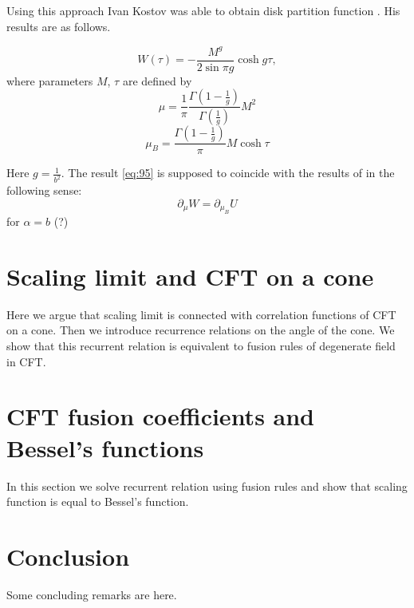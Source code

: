 \documentclass[12pt]{article}
\begin{document}
Using this approach Ivan Kostov was able to obtain disk partition function
\cite{kostov2004boundary,kostov2003boundary}. His results are as follows. 

\begin{equation}
  \label{eq:95}
  W(\tau) = -\frac{M^{g}}{2\sin \pi g} \cosh g\tau,
\end{equation}
where parameters $M$, $\tau$ are defined by
\begin{equation}
  \label{eq:96}
  \mu=\frac{1}{\pi} \frac{\Gamma\left(1-\frac{1}{g}\right)}{\Gamma\left(\frac{1}{g}\right)} M^{2}
\end{equation}
\begin{equation}
  \label{eq:97}
  \mu_{B}=\frac{\Gamma\left(1-\frac{1}{g}\right)}{\pi} M\cosh \tau
\end{equation}

Here $g=\frac{1}{b^{2}}$. The result \eqref{eq:95} is supposed to coincide with the results of
\cite{fateev2000boundary} in the following sense:
\begin{equation}
  \label{eq:98}
  \partial_{\mu} W = \partial_{\mu_{B}} U
\end{equation}
for $\alpha=b$ (?)


\section{Scaling limit and CFT on a cone}
\label{sec:scaling-limit-cft}

Here we argue that scaling limit is connected with correlation
functions of CFT on a cone. Then we introduce recurrence relations on
the angle of the cone. We show that this recurrent relation is
equivalent to fusion rules of degenerate field in CFT. 


\section{CFT fusion coefficients and Bessel's functions}
\label{sec:cft-fusi-coeff}

In this section we solve recurrent relation using fusion rules and
show that scaling function is equal to Bessel's function. 

\section{Conclusion}
\label{sec:conclusion}
Some concluding remarks are here. 

{} 

\end{document}
